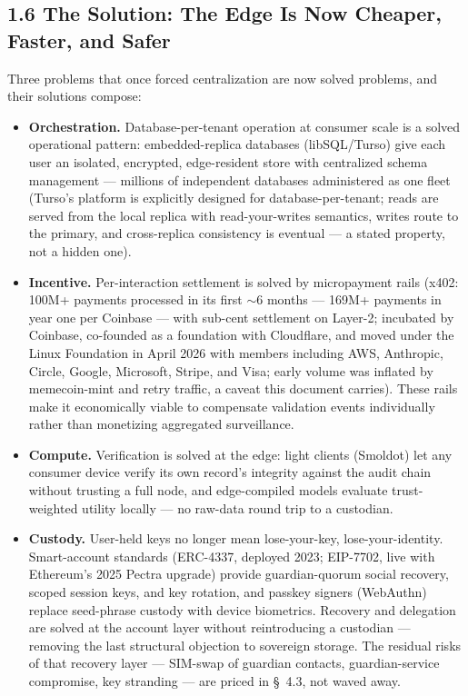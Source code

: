 \documentclass[11pt,twocolumn]{article}
\begin{document}
\subsection*{1.6 The Solution: The Edge Is Now Cheaper, Faster, and Safer}

Three problems that once forced centralization are now solved problems, and their solutions compose:

\begin{itemize}
\item \textbf{Orchestration.} Database-per-tenant operation at consumer scale is a solved operational pattern: embedded-replica databases (libSQL/Turso) give each user an isolated, encrypted, edge-resident store with centralized schema management --- millions of independent databases administered as one fleet (Turso's platform is explicitly designed for database-per-tenant; reads are served from the local replica with read-your-writes semantics, writes route to the primary, and cross-replica consistency is eventual --- a stated property, not a hidden one).
\item \textbf{Incentive.} Per-interaction settlement is solved by micropayment rails (x402: 100M+ payments processed in its first $\sim$6 months --- 169M+ payments in year one per Coinbase --- with sub-cent settlement on Layer-2; incubated by Coinbase, co-founded as a foundation with Cloudflare, and moved under the Linux Foundation in April 2026 with members including AWS, Anthropic, Circle, Google, Microsoft, Stripe, and Visa; early volume was inflated by memecoin-mint and retry traffic, a caveat this document carries). These rails make it economically viable to compensate validation events individually rather than monetizing aggregated surveillance.
\item \textbf{Compute.} Verification is solved at the edge: light clients (Smoldot) let any consumer device verify its own record's integrity against the audit chain without trusting a full node, and edge-compiled models evaluate trust-weighted utility locally --- no raw-data round trip to a custodian.
\item \textbf{Custody.} User-held keys no longer mean lose-your-key, lose-your-identity. Smart-account standards (ERC-4337, deployed 2023; EIP-7702, live with Ethereum's 2025 Pectra upgrade) provide guardian-quorum social recovery, scoped session keys, and key rotation, and passkey signers (WebAuthn) replace seed-phrase custody with device biometrics. Recovery and delegation are solved at the account layer without reintroducing a custodian --- removing the last structural objection to sovereign storage. The residual risks of that recovery layer --- SIM-swap of guardian contacts, guardian-service compromise, key stranding --- are priced in \S~4.3, not waved away.
\end{itemize}
\end{document}
